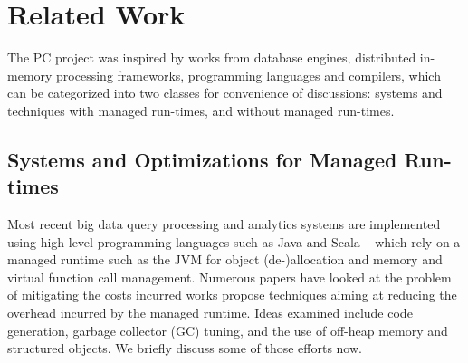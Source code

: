 
\section{Related Work}

The PC project was inspired by works from database engines, distributed in-memory processing
frameworks,  programming languages and compilers, which can be
categorized into two classes for convenience of discussions: systems and techniques with managed
run-times, and without managed run-times.


\subsection {Systems and Optimizations for Managed Run-times}

Most recent big data query processing and analytics
systems are implemented using
high-level programming languages such as Java and Scala  ~\cite{dean2008mapreduce, yu2008dryadlinq,
  neumann2011efficiently, zaharia2012resilient,
  alexandrov2014stratosphere, klonatos2014building,
  crotty2015tupleware, armbrust2015spark} which rely on a managed
runtime such as the JVM for object (de-)allocation and memory and virtual function call management. Numerous papers
have looked at the problem of mitigating the costs incurred
works propose techniques aiming at
reducing the overhead incurred by the managed runtime.  Ideas examined include
code generation, garbage collector (GC) tuning, and the
use of off-heap memory and structured objects.
We briefly discuss some of those efforts now.

